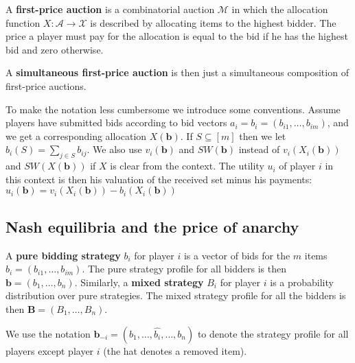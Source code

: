 \begin{definition}
  A \textbf{first-price auction} is a combinatorial auction $ \mathcal{M} $ in which the allocation function $ X: \mathcal{A} \to \mathcal{X} $ is described by allocating items to the highest bidder. The price a player must pay for the allocation is equal to the bid if he has the highest bid and zero otherwise.
\end{definition}

A \textbf{simultaneous first-price auction} is then just a simultaneous composition of first-price auctions.


To make the notation less cumbersome we introduce some conventions. Assume players have submitted bids according to bid vectors $ a_i = b_i = (b_{i1}, \ldots, b_{im}) $, and we get a corresponding allocation $ X(\mathbf{b}) $. If $ S \subseteq [m] $ then we let $ b_i(S) = \sum_{j \in S} b_{ij} $. We also use $ v_i(\mathbf{b}) $ and $ SW(\mathbf{b}) $ instead of $ v_i(X_i(\mathbf{b})) $ and $ SW(X(\mathbf{b})) $ if $ X $ is clear from the context. The utility $ u_i $ of player $ i $ in this context is then his valuation of the received set minus his payments: $ u_i(\mathbf{b})=v_i(X_i(\mathbf{b})) - b_i(X_i(\mathbf{b})) $


\subsection{Nash equilibria and the price of anarchy} %
\label{sub:Nash equilibria and the price of anarchy}
\begin{definition}
  A \textbf{pure bidding strategy} $ b_i $ for player $ i $ is a vector of bids for the $ m $ items $ b_i = (b_{i1}, \ldots, b_{im}) $. The pure strategy profile for all bidders is then $ \mathbf{b}=(b_1, \ldots, b_n) $. Similarly, a \textbf{mixed strategy} $ B_i $ for player $ i $ is a probability distribution over pure strategies. The mixed strategy profile for all the bidders is then $ \mathbf{B}=(B_1, \ldots, B_n) $.
\end{definition}
We use the notation $ \mathbf{b}_{-i} = (b_1,\ldots, \widehat{b_i}, \ldots, b_n) $ to denote the strategy profile for all players except player $ i $ (the hat denotes a removed item).

